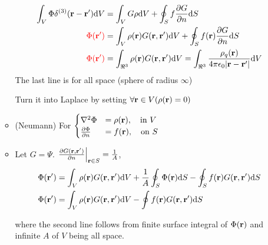 \documentclass{article}
\theoremstyle{remark}
\theoremstyle{remark}
\newcommand{\where}[1]{\begin{flushright}where #1.\end{flushright}}
\begin{document}
\begin{enumerate}
\begin{itemize}
\begin{align*}
                \int_V\Phi\delta^{(3)}(\vb{r}-\vb{r}')\dd V &= \int_V G\rho\dd V+\oint_S f\pdv{G}{n}\dd S\\
                \textcolor{red}{\Phi(\vb{r'})} &= \int_V \rho(\vb{r})G(\vb{r},\vb{r}')\dd V+\oint_S f(\vb{r})\pdv{G}{n}\dd S\\
                \textcolor{red}{\Phi(\vb{r'})} &= \int_{\real^3} \rho(\vb{r})G(\vb{r},\vb{r}')\dd V = \int_{\real^3}\frac{\rho_q(\vb{r})}{4\pi\epsilon_0|\vb{r}-\vb{r}'|}\dd V
            \end{align*}
            The last line is for all space (sphere of radius $\infty$)

            Turn it into Laplace by setting $\forall \vb{r}\in V(\rho(\vb{r})=0)$
            \item (Neumann) For $\begin{cases}
                \laplacian{\Phi}&=\rho(\vb{r}),\quad \mathrm{in}\ V\\
                \pdv{\Phi}{n}&=f(\vb{r}),\quad \mathrm{on}\ S\\
            \end{cases}$
            \item Let $G=\Psi$. $\eval{\pdv{G(\vb{r},\vb{r}')}{n}}_{\vb{r}\in S}=\frac{1}{A}$, \begin{align*}
                \Phi(\vb{r}') &=\int_V\rho(\vb{r})G(\vb{r},\vb{r}')\dd V+\frac{1}{A}\oint_S\Phi(\vb{r})\dd S-\oint_S f(\vb{r})G(\vb{r},\vb{r}')\dd S\\
                \Phi(\vb{r}') &= \int_V\rho(\vb{r})G(\vb{r},\vb{r}')\dd V-\oint f(\vb{r})G(\vb{r},\vb{r}')\dd S
            \end{align*}
            \where{the second line follows from finite surface integral of $\Phi(\vb{r})$ and infinite $A$ of $V$ being all space}
        \end{itemize}
    \end{enumerate}
\end{document}
